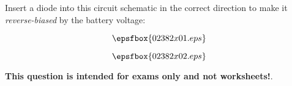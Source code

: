 

Insert a diode into this circuit schematic in the correct direction to make it {\it reverse-biased} by the battery voltage:

$$\epsfbox{02382x01.eps}$$







$$\epsfbox{02382x02.eps}$$







{\bf This question is intended for exams only and not worksheets!}.




